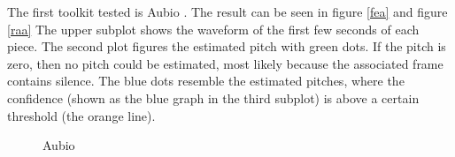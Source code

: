 The first toolkit tested is Aubio \cite{aubio1}. The result can be seen in figure \ref{fea} and figure \ref{raa}
The upper subplot shows the waveform of the first few seconds of each piece. The second plot figures the estimated pitch with green dots. If the pitch is zero, then no pitch could be estimated, most likely because the associated frame contains silence. The blue dots resemble the estimated pitches, where the confidence (shown as the blue graph in the third subplot) is above a certain threshold (the orange line).
\begin{figure}[htbp]
	\centering
	\caption{Aubio}
	\label{fig:aubio}
\end{figure}
